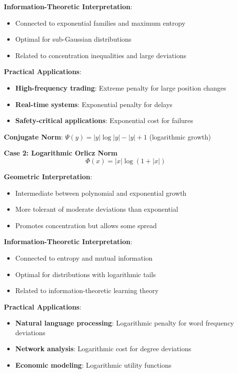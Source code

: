 \documentclass{amsart}
\theoremstyle{plain}
\theoremstyle{definition}
\theoremstyle{remark}
\begin{document}
\textbf{Information-Theoretic Interpretation}:

\begin{itemize}
	\item Connected to exponential families and maximum entropy
	\item Optimal for sub-Gaussian distributions
	\item Related to concentration inequalities and large deviations
\end{itemize}

\textbf{Practical Applications}:

\begin{itemize}
	\item \textbf{High-frequency trading}: Extreme penalty for large position changes
	\item \textbf{Real-time systems}: Exponential penalty for delays
	\item \textbf{Safety-critical applications}: Exponential cost for failures
\end{itemize}

\textbf{Conjugate Norm}: $\Psi(y) = |y|\log|y| - |y| + 1$ (logarithmic growth)

\textbf{Case 2: Logarithmic Orlicz Norm}
\[
\Phi(x) = |x|\log(1 + |x|)
\]

\textbf{Geometric Interpretation}:

\begin{itemize}
	\item Intermediate between polynomial and exponential growth
	\item More tolerant of moderate deviations than exponential
	\item Promotes concentration but allows some spread
\end{itemize}

\textbf{Information-Theoretic Interpretation}:

\begin{itemize}
	\item Connected to entropy and mutual information
	\item Optimal for distributions with logarithmic tails
	\item Related to information-theoretic learning theory
\end{itemize}

\textbf{Practical Applications}:

\begin{itemize}
	\item \textbf{Natural language processing}: Logarithmic penalty for word frequency deviations
	\item \textbf{Network analysis}: Logarithmic cost for degree deviations
	\item \textbf{Economic modeling}: Logarithmic utility functions
\end{itemize}
\end{document}
